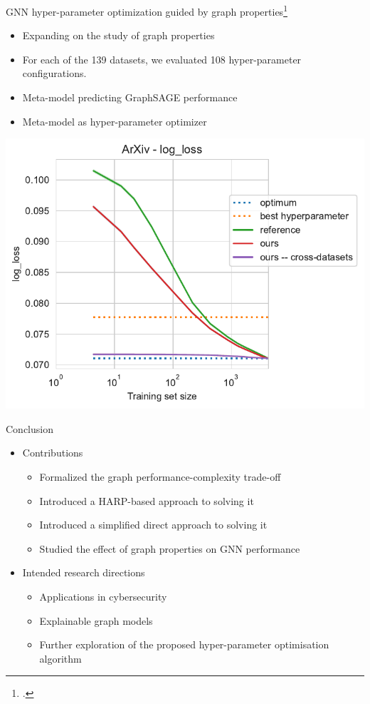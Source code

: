 \documentclass[10pt]{beamer}
\begin{document}
\begin{frame}{GNN hyper-parameter optimization guided by graph properties\footcite{prochazka_which_2023}}
	\begin{itemize}
		\item Expanding on the study of graph properties
		\item For each of the 139 datasets, we evaluated 108 hyper-parameter configurations.
		\item Meta-model predicting GraphSAGE performance
		\item Meta-model as hyper-parameter optimizer
	\end{itemize}

	\vfill

	\centering
	\includegraphics[width=0.6\linewidth]{images/hyperpar_tuning_single.pdf}
\end{frame}

\begin{frame}{Conclusion}
	\begin{itemize}
		\item Contributions
		\begin{itemize}
			\item Formalized the graph performance-complexity trade-off
			\item Introduced a HARP-based approach to solving it
			\item Introduced a simplified direct approach to solving it
			\item Studied the effect of graph properties on GNN performance
		\end{itemize}
		\item Intended research directions
		\begin{itemize}
			\item Applications in cybersecurity
			\item Explainable graph models
			\item Further exploration of the proposed hyper-parameter optimisation algorithm
		\end{itemize}
	\end{itemize}
\end{frame}
\end{document}
